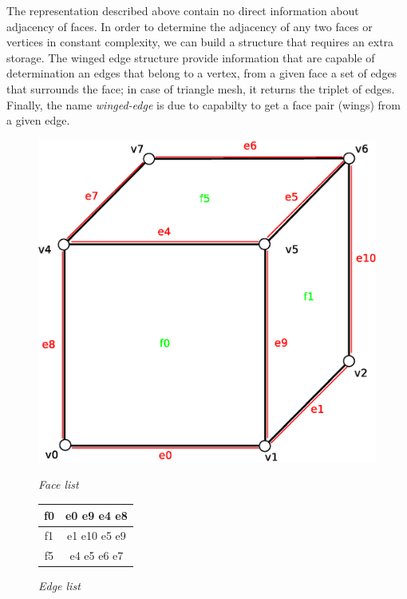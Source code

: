 The representation described above contain no direct information about adjacency of faces. 
In order to determine the adjacency of any two faces or vertices in constant complexity, we
can build a structure that requires an extra storage. The winged edge structure provide information
that are capable of determination an edges that belong to a vertex, from a given face a set
of edges that surrounds the face; in case of triangle mesh, it returns the triplet of edges.
Finally, the name \emph{winged-edge} is due to capabilty to get a face pair (wings) from
a given edge.

\begin{figure}[h]
\label{fig:winged_edge_mesh}

\begin{minipage}[hb]{0.65\linewidth}
\centering
\includegraphics[width=0.6\linewidth]{../img/we_rep_mesh.eps}
\label{fig:figure1}
\end{minipage}
\hspace{0.5cm}
\begin{minipage}[hb]{0.25\linewidth}
\centering

\emph{Face list}
\vspace{1mm}

\begin{tabular}{|c|c|}
\hline
\textsf{f0} & \textsf{e0 e9 e4 e8}\\
\hline
\textsf{f1} & \textsf{e1 e10 e5 e9}\\
\hline
\textsf{f5} & \textsf{e4 e5 e6 e7}\\
\hline
\end{tabular}

\vspace{10mm}
\emph{Edge list}
\vspace{1mm}


\end{minipage}
\end{figure}
